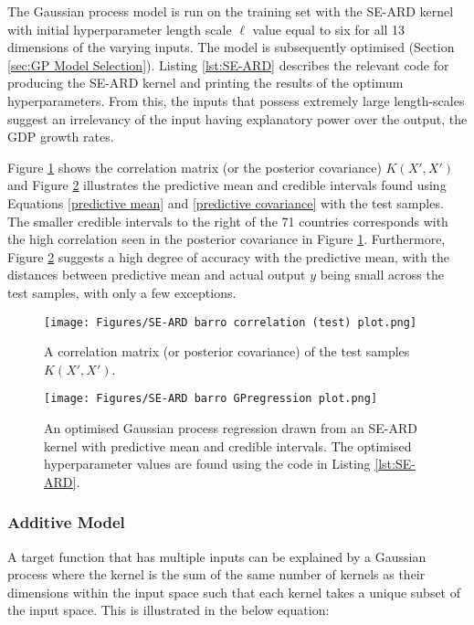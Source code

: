 \documentclass[12pt,a4paper]{article}
\begin{document}
The Gaussian process model is run on the training set with the SE-ARD kernel with initial hyperparameter length scale \(\ell\) value equal to six for all 13 dimensions of the varying inputs. The model is subsequently optimised (Section \ref{sec:GP Model Selection}). Listing \ref{lst:SE-ARD} describes the relevant code for producing the SE-ARD kernel and printing the results of the optimum hyperparameters. From this, the inputs that possess extremely large length-scales suggest an irrelevancy of the input having explanatory power over the output, the GDP growth rates. 


Figure \ref{fig:SE-ARD barro correlation (test) plot} shows the correlation matrix (or the posterior covariance) \(K(X',X')\) and Figure \ref{fig:SE-ARD barro GPregression plot} illustrates the predictive mean and credible intervals found using Equations \eqref{predictive mean} and \eqref{predictive covariance} with the test samples. The smaller credible intervals to the right of the 71 countries corresponds with the high correlation seen in the posterior covariance in Figure \ref{fig:SE-ARD barro correlation (test) plot}. Furthermore, Figure \ref{fig:SE-ARD barro GPregression plot} suggests a high degree of accuracy with the predictive mean, with the distances between predictive mean and actual output \(y\) being small across the test samples, with only a few exceptions. 

\begin{figure}[h]
\centering
\texttt{[image: Figures/SE-ARD barro correlation (test) plot.png]} 
\caption{A correlation matrix (or posterior covariance) of the test samples \(K(X',X')\).} \label{fig:SE-ARD barro correlation (test) plot}
\end{figure}


\begin{figure}[h]
\centering
\texttt{[image: Figures/SE-ARD barro GPregression plot.png]} 
\caption{An optimised Gaussian process regression drawn from an SE-ARD kernel with predictive mean and credible intervals. The optimised hyperparameter values are found using the code in Listing \ref{lst:SE-ARD}.} \label{fig:SE-ARD barro GPregression plot}
\end{figure}

\clearpage
\subsubsection{Additive Model}

A target function that has multiple inputs can be explained by a Gaussian process where the kernel is the sum of the same number of kernels as their dimensions within the input space such that each kernel takes a unique subset of the input space. This is illustrated in the below equation:
\end{document}
